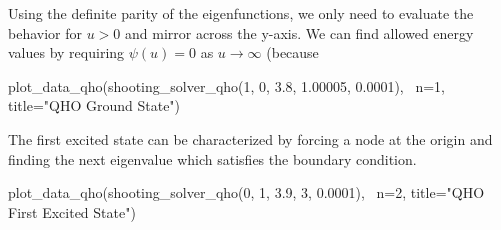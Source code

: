 \documentclass{article}
\begin{document}
Using the definite parity of the eigenfunctions, we only need to evaluate the
behavior for $u > 0$ and mirror across the y-axis. We can find allowed energy values by
requiring $\psi(u) = 0$ as $u \rightarrow \infty$ (because 

\begin{sageblock}
plot_data_qho(shooting_solver_qho(1, 0, 3.8, 1.00005, 0.0001), \
              n=1, title="QHO Ground State")
\end{sageblock}
\begin{figure}[H]
\end{figure}

The first excited state can be characterized by forcing a node at the origin
and finding the next eigenvalue which satisfies the boundary condition.

\begin{sageblock}
plot_data_qho(shooting_solver_qho(0, 1, 3.9, 3, 0.0001), \
              n=2, title="QHO First Excited State")
\end{sageblock}
\begin{figure}[H]
\end{figure}
\end{document}
